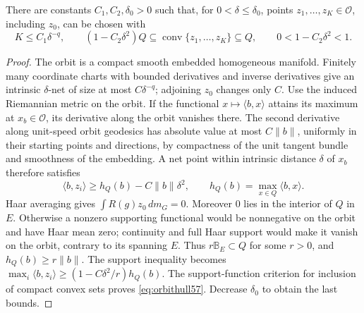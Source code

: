 \begin{lemma}\label{lem:orbithull57}
There are constants $C_1,C_2,\delta_0>0$ such that, for $0<\delta\le\delta_0$, points $z_1,\ldots,z_K\in\mathcal O$, including $z_0$, can be chosen with
\begin{equation}\label{eq:orbithull57}
 K\le C_1\delta^{-q},\qquad
 (1-C_2\delta^2)Q\subseteq\operatorname{conv}\{z_1,\ldots,z_K\}\subseteq Q,
 \qquad 0<1-C_2\delta^2<1.
\end{equation}
\end{lemma}
\begin{proof}
The orbit is a compact smooth embedded homogeneous manifold. Finitely many coordinate charts with bounded derivatives and inverse derivatives give an intrinsic $\delta$-net of size at most $C\delta^{-q}$; adjoining $z_0$ changes only $C$. Use the induced Riemannian metric on the orbit. If the functional $x\mapsto\langle b,x\rangle$ attains its maximum at $x_b\in\mathcal O$, its derivative along the orbit vanishes there. The second derivative along unit-speed orbit geodesics has absolute value at most $C\|b\|$, uniformly in their starting points and directions, by compactness of the unit tangent bundle and smoothness of the embedding. A net point within intrinsic distance $\delta$ of $x_b$ therefore satisfies
\[
 \langle b,z_i\rangle\ge h_Q(b)-C\|b\|\delta^2,
 \qquad h_Q(b)=\max_{x\in Q}\langle b,x\rangle.
\]
Haar averaging gives $\int R(g)z_0\,dm_G=0$. Moreover $0$ lies in the interior of $Q$ in $E$. Otherwise a nonzero supporting functional would be nonnegative on the orbit and have Haar mean zero; continuity and full Haar support would make it vanish on the orbit, contrary to its spanning $E$. Thus $r\mathbb B_E\subset Q$ for some $r>0$, and $h_Q(b)\ge r\|b\|$. The support inequality becomes
$\max_i\langle b,z_i\rangle\ge(1-C\delta^2/r)h_Q(b)$.
The support-function criterion for inclusion of compact convex sets proves \eqref{eq:orbithull57}. Decrease $\delta_0$ to obtain the last bounds.
\end{proof}

